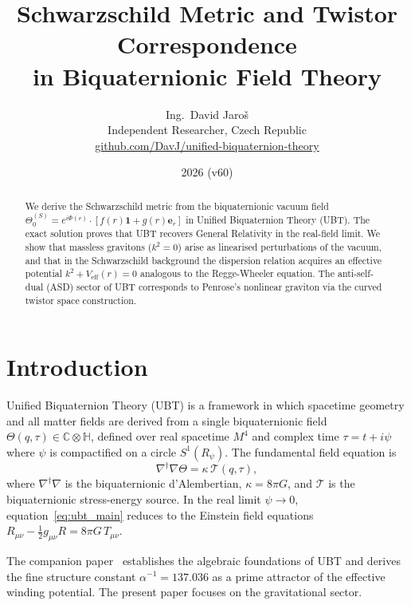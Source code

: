 \documentclass[11pt,a4paper]{article}
\title{\textbf{Schwarzschild Metric and Twistor Correspondence\\
       in Biquaternionic Field Theory}}
\author{Ing.\ David Jaroš\\
  \small Independent Researcher, Czech Republic\\
  \small \href{https://github.com/DavJ/unified-biquaternion-theory}{github.com/DavJ/unified-biquaternion-theory}}
\date{2026 (v60)}
\theoremstyle{definition}
\theoremstyle{remark}
\begin{document}
\maketitle

\begin{abstract}
We derive the Schwarzschild metric from the biquaternionic vacuum field
$\Theta_0^{(S)} = e^{i\Phi(r)}\cdot[f(r)\mathbf{1}+g(r)\boldsymbol{e}_r]$
in Unified Biquaternion Theory (UBT). The exact solution proves that
UBT recovers General Relativity in the real-field limit.
We show that massless gravitons ($k^2 = 0$) arise as linearised perturbations
of the vacuum, and that in the Schwarzschild background the dispersion
relation acquires an effective potential $k^2 + V_{\text{eff}}(r) = 0$
analogous to the Regge-Wheeler equation.
The anti-self-dual (ASD) sector of UBT corresponds to Penrose's nonlinear
graviton via the curved twistor space construction.
\end{abstract}

\section{Introduction}
\label{sec:intro}

Unified Biquaternion Theory (UBT) is a framework in which spacetime geometry
and all matter fields are derived from a single biquaternionic field
$\Theta(q,\tau) \in \mathbb{C}\otimes\mathbb{H}$, defined over real
spacetime $M^4$ and complex time $\tau = t + i\psi$ where $\psi$ is
compactified on a circle $S^1(R_\psi)$.
The fundamental field equation is
\begin{equation}
  \nabla^\dagger\nabla\Theta = \kappa\,\mathcal{T}(q,\tau),
  \label{eq:ubt_main}
\end{equation}
where $\nabla^\dagger\nabla$ is the biquaternionic d'Alembertian,
$\kappa = 8\pi G$, and $\mathcal{T}$ is the biquaternionic stress-energy
source.  In the real limit $\psi \to 0$, equation~\eqref{eq:ubt_main}
reduces to the Einstein field equations
$R_{\mu\nu} - \tfrac{1}{2}g_{\mu\nu}R = 8\pi G\,T_{\mu\nu}$.

The companion paper~\cite{UBTAlpha} establishes the algebraic foundations
of UBT and derives the fine structure constant $\alpha^{-1} = 137.036$ as
a prime attractor of the effective winding potential.  The present paper
focuses on the gravitational sector.
\end{document}
